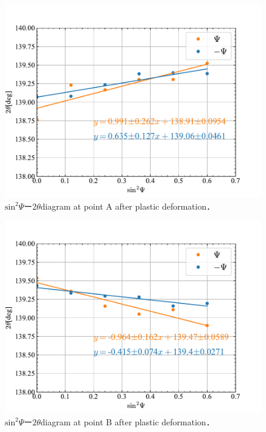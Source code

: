 \begin{figure}[htbp]
    \centering %
    \includegraphics[width=100truemm,clip]{fig/fig_AfterRed.pdf}
    \caption{$\mathrm{sin}^2\Psi$ー$2\theta$diagram at point A after plastic deformation．}
    \label{fig:fig_AfterRed}
\end{figure}

\begin{figure}[htbp]
    \centering %
    \includegraphics[width=100truemm,clip]{fig/fig_AfterBlack.pdf}
    \caption{$\mathrm{sin}^2\Psi$ー$2\theta$diagram at point B after plastic deformation．}
    \label{fig:fig_AfterBlack}
\end{figure}

